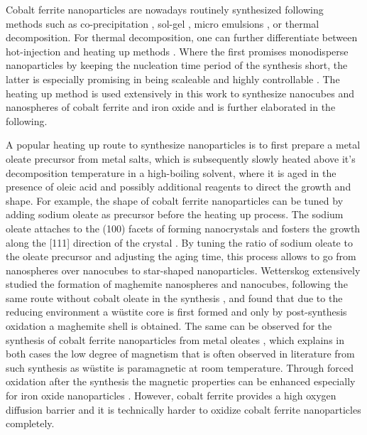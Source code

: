 \documentclass[\main/dresen_thesis.tex]{subfiles}
\begin{document}
  Cobalt ferrite nanoparticles are nowadays routinely synthesized following methods such as co-precipitation \cite{Fried_2001_Order}, sol-gel \cite{Niederberger_2009_Metal}, micro emulsions \cite{Pillai_1996_Synth}, or thermal decomposition.
  For thermal decomposition, one can further differentiate between hot-injection \cite{Hyeon_2003_Chemi} and heating up methods \cite{Embden_2015_TheHe}.
  Where the first promises monodisperse nanoparticles by keeping the nucleation time period of the synthesis short, the latter is especially promising in being scaleable and highly controllable \cite{Park_2004_Ultra}.
  The heating up method is used extensively in this work to synthesize nanocubes and nanospheres of cobalt ferrite and iron oxide and is further elaborated in the following.

  A popular heating up route to synthesize nanoparticles is to first prepare a metal oleate precursor from metal salts, which is subsequently slowly heated above it's decomposition temperature in a high-boiling solvent, where it is aged in the presence of oleic acid and possibly additional reagents to direct the growth and shape.
  For example, the shape of cobalt ferrite nanoparticles can be tuned by adding sodium oleate as precursor before the heating up process.
  The sodium oleate attaches to the (100) facets of forming nanocrystals and fosters the growth along the [111] direction of the crystal \cite{Bao_2009_Forma}.
  By tuning the ratio of sodium oleate to the oleate precursor and adjusting the aging time, this process allows to go from nanospheres over nanocubes to star-shaped nanoparticles.
  Wetterskog \etal extensively studied the formation of maghemite nanospheres and nanocubes, following the same route without cobalt oleate in the synthesis \cite{Wetterskog_2014_Preci, Wetterskog_2013_Anoma}, and found that due to the reducing environment a w\"ustite core is first formed and only by post-synthesis oxidation a maghemite shell is obtained.
  The same can be observed for the synthesis of cobalt ferrite nanoparticles from metal oleates \cite{Bodnarchuk_2009_Excha}, which explains in both cases the low degree of magnetism that is often observed in literature from such synthesis as w\"ustite is paramagnetic at room temperature.
  Through forced oxidation after the synthesis the magnetic properties can be enhanced especially for iron oxide nanoparticles \cite{Wetterskog_2013_Anoma}.
  However, cobalt ferrite provides a high oxygen diffusion barrier \cite{Chen_2015_Synth} and it is technically harder to oxidize cobalt ferrite nanoparticles completely.
\end{document}
